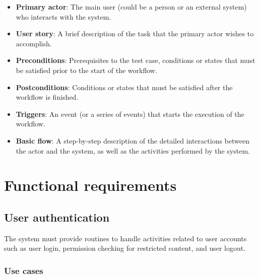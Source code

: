 \begin{itemize}

\item \textbf{Primary actor}:
The main user (could be a person or an external system) who interacts with the
system.

\item \textbf{User story}:
A brief description of the task that the primary actor wishes to accomplish.

\item \textbf{Preconditions}:
Prerequisites to the test case,
conditions or states that must be satisfied prior to the start of the workflow.

\item \textbf{Postconditions}:
Conditions or states that must be satisfied after the workflow is finished.

\item \textbf{Triggers}:
An event (or a series of events) that starts the execution of the workflow.

\item \textbf{Basic flow}:
A step-by-step description of the detailed interactions between the actor and
the system, as well as the activities performed by the system.

\end{itemize}

\section{Functional requirements}
\label{FUNCREQS}

\subsection{User authentication}

The system must provide routines to handle activities related to user accounts
such as user login, permission checking for restricted content, and user logout.

\subsubsection{Use cases}

